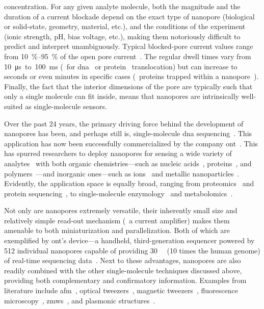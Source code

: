 concentration. For any given analyte molecule, both the magnitude and the duration of a current blockade
depend on the exact type of nanopore (biological or solid-state, geometry, material, etc.), and the conditions
of the experiment (ionic strength, pH, bias voltage, etc.), making them notoriously difficult to predict and
interpret unambiguously. Typical blocked-pore current values range from \SIrange{10}{95}{\percent} of the open
pore current~\cite{Fragasso-2020,Zernia-2020,Howorka-2009}. The regular dwell times vary from
\SI{10}{\us}~to~\SI{100}{\ms} (\eg~for \gls{dna}~\cite{Maglia-2010} or protein~\cite{Watanabe-2017}
translocation) but can increase to seconds or even minutes in specific cases (\eg~proteins trapped within a
nanopore~\cite{Soskine-2012}). Finally, the fact that the interior dimensions of the pore are typically such
that only a single molecule can fit inside, means that nanopores are intrinsically well-suited as
single-molecule sensors.

Over the past 24 years, the primary driving force behind the development of nanopores has been, and perhaps
still is, single-molecule \gls{dna} sequencing~\cite{Deamer-2016}. This application has now been successfully
commercialized by the company \gls{ont}~\cite{ONT-2020,Jain-2018}. This has spurred researchers to deploy
nanopores for sensing a wide variety of analytes~\cite{Wang-2018} with both organic chemistries---such as
nucleic acids~\cite{Kasianowicz-1996,Meller-2000,Stoddart-2009,Manrao-2012},
proteins~\cite{Mohammad-2008,Firnkes-2010,Spiering-2011,RodriguezLarrea-2013}, and
polymers~\cite{Robertson-2007,Baaken-2011}---and inorganic ones---such as
ions~\cite{Bezrukov-1993,Kasianowicz-1995,Kasianowicz-1999,Ali-2011,Roozbahani-2020} and metallic
nanoparticles~\cite{Astier-2009,Angevine-2014,Campos-2018}. Evidently, the application space is equally broad,
ranging from proteomics~\cite{Yusko-2017,Houghtaling-2019} and protein
sequencing~\cite{Restrepo-Perez-2018,Huang-2019}, to single-molecule
enzymology~\cite{Willems-VanMeervelt-2017,Ho-2015,Wloka-2017,Harrington-2019,Galenkamp-2020} and
metabolomics~\cite{VanMeervelt-2017,Zernia-2020}.

Not only are nanopores extremely versatile, their inherently small size and relatively simple read-out
mechanism (\ie~a current amplifier) makes them amenable to both miniaturization and parallelization. Both of
which are exemplified by \gls{ont}'s  device---a handheld, third-generation sequencer powered by
\num{512} individual nanopores capable of providing \SI{30}{\giga\bp} (10 times the human genome) of real-time
sequencing data~\cite{ONT-2020}. Next to these advantages, nanopores are also readily combined with the other
single-molecule techniques discussed above, providing both complementary and confirmatory information. Examples
from literature include \gls{afm}~\cite{Aramesh-2019}, optical
tweezers~\cite{Keyser-2006,vanDorp-2009,Hall-2009,Galla-2014}, magnetic tweezers~\cite{Peng-2009},
fluorescence microscopy~\cite{McNally-2010,Anderson-2014,Assad-2014,Huang-2015},
\glspl{zmw}~\cite{Auger-2014,Larkin-2017,Spitzberg-2019}, and plasmonic
structures~\cite{Im-2010,Chen-2018,Verschueren-2018,Garoli-2019}.


